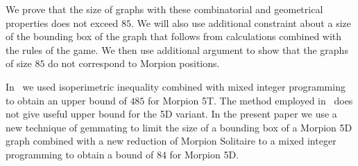 We prove that the
  size of graphs with these combinatorial and geometrical properties does not exceed $85$.
We will also use additional constraint about a size of the bounding box of the graph that follows from
  calculations combined with the rules of the game.
We then use additional argument to show that the graphs of size $85$ do not correspond to Morpion positions.

In~\cite{ijcai} we used isoperimetric inequality combined with mixed integer programming to obtain an upper bound of $485$ for Morpion 5T. 
The method employed in~\cite{ijcai} does not give useful upper bound for the 5D variant.
In the present paper we use a new technique of gemmating to limit the size of a bounding box of a Morpion 5D graph combined with a new reduction of Morpion Solitaire to a mixed integer programming to obtain a bound of $84$ for Morpion 5D. 
